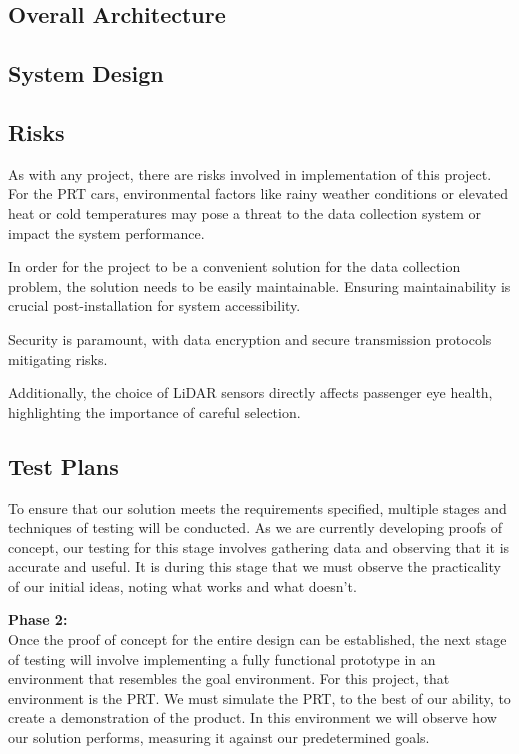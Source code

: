 \subsection{Overall Architecture}


\subsection{System Design}


\subsection{Risks}
As with any project, there are risks involved in implementation of this project. 
For the PRT cars, environmental factors like rainy weather conditions or elevated heat or cold temperatures may pose a threat to the data collection system or impact the system performance.

In order for the project to be a convenient solution for the data collection problem, the solution needs to be easily maintainable. 
Ensuring maintainability is crucial post-installation for system accessibility. 

Security is paramount, with data encryption and secure transmission protocols mitigating risks. 

Additionally, the choice of LiDAR sensors directly affects passenger eye health, highlighting the importance of careful selection.


\subsection{Test Plans}
To ensure that our solution meets the requirements specified, multiple stages and techniques of testing will be conducted. 
As we are currently developing proofs of concept, our testing for this stage involves gathering data and observing that it is accurate and useful. 
It is during this stage that we must observe the practicality of our initial ideas, noting what works and what doesn’t.

\noindent\textbf{Phase 2:}\\
\indent Once the proof of concept for the entire design can be established, the next stage of testing will involve implementing a fully functional prototype in an environment that resembles the goal environment. 
For this project, that environment is the PRT. 
We must simulate the PRT, to the best of our ability, to create a demonstration of the product. 
In this environment we will observe how our solution performs, measuring it against our predetermined goals. 

